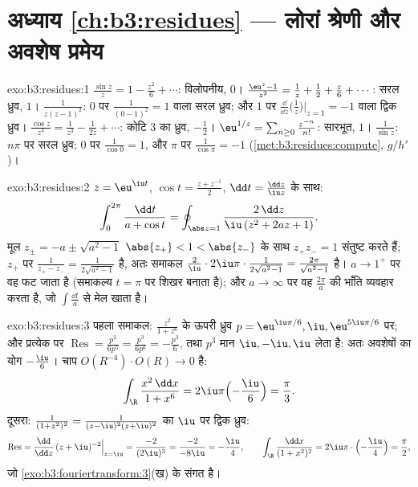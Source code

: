 \section*{अध्याय \ref{ch:b3:residues} --- लोरां श्रेणी और
अवशेष प्रमेय}

\begin{solution}{exo:b3:residues:1}
$\frac{\sin z}z = 1 - \frac{z^2}6 + \cdots$: विलोपनीय,  $0$। $\frac{\eu^z - 1}{z^2} = \frac1z + \frac12 +
\frac z6 + \cdots$: सरल ध्रुव,  $1$। $\frac1{z(z-1)^2}$: $0$ पर
 $\frac1{(0-1)^2} = 1$ वाला सरल ध्रुव; और $1$ पर  $\frac{\dd}{\dd z}\bigl(\frac1z\bigr)\big|_{z=1} = -1$ वाला द्विक ध्रुव।
$\frac{\cos z}{z^3} = \frac1{z^3} - \frac1{2z} + \cdots$: कोटि $3$ का ध्रुव,  $-\frac12$। $\eu^{1/z} = \sum_{n\geq0}
\frac{z^{-n}}{n!}$: सारभूत,  $1$।
$\frac1{\sin z}$: $n\pi$ पर सरल ध्रुव; $0$ पर  $\frac1{\cos 0} = 1$, और $\pi$ पर $\frac1{\cos\pi} = -1$ (\cref{met:b3:residues:compute},
$g/h'$)।
\end{solution}

\begin{solution}{exo:b3:residues:2}
$z = \eu^{\iu t}$, $\cos t = \frac{z + z^{-1}}2$, $\dd t
= \frac{\dd z}{\iu z}$ के साथ:
\[
\int_0^{2\pi}\frac{\dd t}{a + \cos t}
= \oint_{\abs z = 1}\frac{2\,\dd z}{\iu\,(z^2 + 2az + 1)} .
\]
मूल $z_\pm = -a \pm \sqrt{a^2 - 1}$ $\abs{z_+} < 1 < \abs{z_-}$ के साथ $z_+z_- =
1$ संतुष्ट करते हैं; $z_+$ पर  $\frac{1}{z_+ - z_-} = \frac1{2\sqrt{a^2-1}}$ है,
अतः समाकल $\frac2\iu\cdot2\iu\pi\cdot\frac1{2\sqrt{a^2-1}} =
\frac{2\pi}{\sqrt{a^2-1}}$ है। $a \to 1^+$ पर वह फट जाता है (समाकल्य $t = \pi$ पर शिखर बनाता
है); और $a \to \infty$ पर वह $\frac{2\pi}a$ की भाँति व्यवहार करता है, जो $\int\frac{\dd t}a$ से मेल
खाता है।
\end{solution}

\begin{solution}{exo:b3:residues:3}
पहला समाकल: $\frac{z^2}{1+z^6}$ के ऊपरी ध्रुव $p =
\eu^{\iu\pi/6}, \iu, \eu^{5\iu\pi/6}$ पर; और प्रत्येक पर $\operatorname{Res} = \frac{p^2}{6p^5} = \frac{p^3}{6p^6} =
-\frac{p^3}6$, तथा
$p^3$ मान $\iu, -\iu, \iu$ लेता है: अतः अवशेषों का योग $-\frac{\iu}{6}$। चाप $O(R^{-4})\cdot O(R) \to 0$ है:
\[
\int_\R\frac{x^2\,\dd x}{1 + x^6} =
2\iu\pi\Bigl(-\frac \iu6\Bigr) = \frac\pi3 .
\]
दूसरा: $\frac1{(1+z^2)^2} =
\frac1{(z-\iu)^2(z+\iu)^2}$ का $\iu$ पर द्विक ध्रुव:
\[
\operatorname{Res} = \frac{\dd}{\dd z}\,(z +
\iu)^{-2}\Big|_{z=\iu} = \frac{-2}{(2\iu)^3} =
\frac{-2}{-8\iu} = -\frac\iu4,
\qquad
\int_\R\frac{\dd x}{(1+x^2)^2} =
2\iu\pi\cdot\Bigl(-\frac\iu4\Bigr) = \frac\pi2 ,
\]
जो \cref{exo:b3:fouriertransform:3}(ख) के संगत है।
\end{solution}

